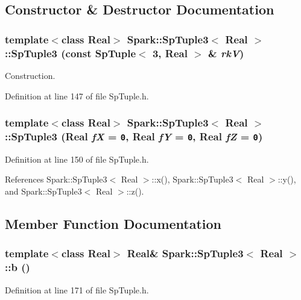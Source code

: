 \subsection{Constructor \& Destructor Documentation}
\subsubsection{\setlength{\rightskip}{0pt plus 5cm}template$<$class Real$>$ {\bf Spark::Sp\-Tuple3}$<$ Real $>$::{\bf Sp\-Tuple3} (const {\bf Sp\-Tuple}$<$ 3, Real $>$ \& {\em rk\-V})\hspace{0.3cm}{\tt  [inline]}}\label{classSpark_1_1SpTuple3_a0}


Construction. 

Definition at line 147 of file Sp\-Tuple.h.
\subsubsection{\setlength{\rightskip}{0pt plus 5cm}template$<$class Real$>$ {\bf Spark::Sp\-Tuple3}$<$ Real $>$::{\bf Sp\-Tuple3} (Real {\em f\-X} = {\tt 0}, Real {\em f\-Y} = {\tt 0}, Real {\em f\-Z} = {\tt 0})\hspace{0.3cm}{\tt  [inline]}}\label{classSpark_1_1SpTuple3_a1}


Definition at line 150 of file Sp\-Tuple.h.

References Spark::Sp\-Tuple3$<$ Real $>$::x(), Spark::Sp\-Tuple3$<$ Real $>$::y(), and Spark::Sp\-Tuple3$<$ Real $>$::z().

\subsection{Member Function Documentation}
\subsubsection{\setlength{\rightskip}{0pt plus 5cm}template$<$class Real$>$ Real\& {\bf Spark::Sp\-Tuple3}$<$ Real $>$::b ()\hspace{0.3cm}{\tt  [inline]}}\label{classSpark_1_1SpTuple3_a13}


Definition at line 171 of file Sp\-Tuple.h.
